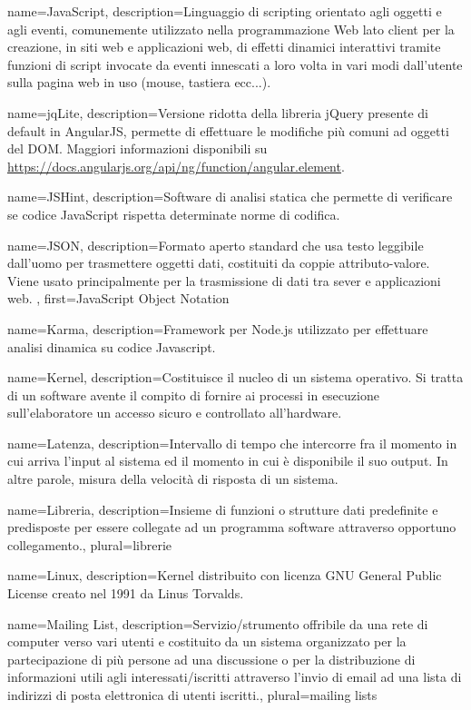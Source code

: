 {
name={JavaScript},
description={Linguaggio di scripting orientato agli oggetti e agli eventi, comunemente utilizzato nella programmazione Web lato client per la creazione, in siti web e applicazioni web, di effetti dinamici interattivi tramite funzioni di script invocate da eventi innescati a loro volta in vari modi dall'utente sulla pagina web in uso (mouse, tastiera ecc...).}
}

{
name={jqLite},
description={Versione ridotta della libreria jQuery presente di default in AngularJS, permette di effettuare le modifiche più comuni ad oggetti del DOM. Maggiori informazioni disponibili su \url{https://docs.angularjs.org/api/ng/function/angular.element}.}
}

{
name={JSHint},
description={Software di analisi statica che permette di verificare se codice JavaScript rispetta determinate norme di codifica.}
}

{
name={JSON},
description={Formato aperto standard che usa testo leggibile dall'uomo per trasmettere oggetti dati, costituiti da coppie attributo-valore. Viene usato principalmente per la trasmissione di dati tra sever e applicazioni web. },
first={JavaScript Object Notation}
}

{
name={Karma},
description={Framework per Node.js utilizzato per effettuare analisi dinamica su codice Javascript.}
}

{
name={Kernel},
description={Costituisce il nucleo di un sistema operativo. Si tratta di un software avente il compito di fornire ai processi in esecuzione sull'elaboratore un accesso sicuro e controllato all'hardware.}
}

{
name={Latenza},
description={Intervallo di tempo che intercorre fra il momento in cui arriva l'input al sistema ed il momento in cui è disponibile il suo output. In altre parole, misura della velocità di risposta di un sistema.}
}

{
name={Libreria},
description={Insieme di funzioni o strutture dati predefinite e predisposte per essere collegate ad un programma software attraverso opportuno collegamento.},
plural={librerie}
}

{
name={Linux},
description={Kernel distribuito con licenza GNU General Public License creato nel 1991 da Linus Torvalds.}
}

{
name={Mailing List},
description={Servizio/strumento offribile da una rete di computer verso vari utenti e costituito da un sistema organizzato per la partecipazione di più persone ad una discussione o per la distribuzione di informazioni utili agli interessati/iscritti attraverso l'invio di email ad una lista di indirizzi di posta elettronica di utenti iscritti.},
plural={mailing lists}
}

